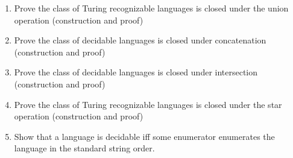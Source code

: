\documentclass{article}
\begin{document}
\begin{enumerate}
        \item Prove the class of Turing recognizable languages is closed under the union operation 
        (construction and proof)
        \item Prove the class of decidable languages is closed under concatenation (construction 
        and proof)
        \item Prove the class of decidable languages is closed under intersection (construction 
        and proof)
        \item Prove the class of Turing recognizable languages is closed under the star operation 
        (construction and proof)
        \item Show that a language is decidable iff some enumerator enumerates the language in
        the standard string order.
    \end{enumerate}
\end{document}
